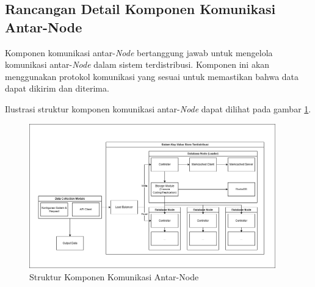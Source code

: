 \subsection{Rancangan Detail Komponen Komunikasi Antar-Node}
\label{subsection:detail-subsistem-komunikasi-antar-node}

Komponen komunikasi antar-\textit{Node} bertanggung jawab untuk mengelola komunikasi antar-\textit{Node} dalam sistem terdistribusi. Komponen ini akan menggunakan protokol komunikasi yang sesuai untuk memastikan bahwa data dapat dikirim dan diterima.

Ilustrasi struktur komponen komunikasi antar-\textit{Node} dapat dilihat pada gambar \ref{fig:node-communication-structure}.

\begin{figure}[ht]
    \centering
    \includegraphics[width=0.95\textwidth]{resources/chapter-3/general-architecture.png}
    \caption{Struktur Komponen Komunikasi Antar-Node}
    \label{fig:node-communication-structure}
\end{figure}